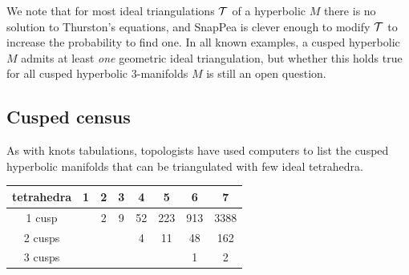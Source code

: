 We note that for most ideal triangulations $\mathcal{T}$ of a hyperbolic $M$ there is no solution to Thurston's equations, and SnapPea is clever enough to modify $\mathcal{T}$ to increase the probability to find one. In all known examples, a cusped hyperbolic $M$ admits at least \emph{one} geometric ideal triangulation, but whether this holds true for all cusped hyperbolic 3-manifolds $M$ is still an open question.

\subsection{Cusped census}
As with knots tabulations, topologists have used computers to list the cusped hyperbolic manifolds that can be triangulated with few ideal tetrahedra.

\begin{table}
\begin{center}
\begin{tabular}{c||ccccccc}
tetrahedra        & 1 & 2 & 3 & 4 & 5 & 6 & 7 \\
 \hline \hline
1 cusp &  & 2 & 9 & 52 & 223 & 913 & 3388 \\
2 cusps & & & & 4 & 11 & 48 & 162  \\
3 cusps & & & & & & 1 & 2
\end{tabular}
\vspace{.2 cm}
\label{cusped:census:table}
\end{center}
\end{table}

